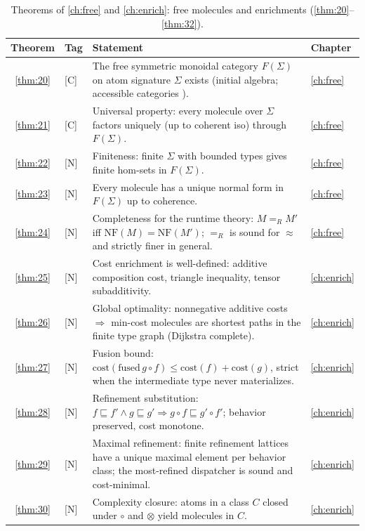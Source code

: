\begin{table}[!htbp]
\centering
\caption{Theorems of \autoref{ch:free} and \autoref{ch:enrich}: free molecules and enrichments (\autoref{thm:20}--\autoref{thm:32}).}
\label{tab:thm-free-enrich}
\small
\begin{tabular}{@{}clp{7.2cm}l@{}}
\toprule
Theorem & Tag & Statement & Chapter\\
\midrule
\ref{thm:20} & [C] & The free symmetric monoidal category $F (\Sigma)$ on atom signature $\Sigma$ exists (initial algebra; accessible categories \cite{adamek}). & \autoref{ch:free}\\
\ref{thm:21} & [C] & Universal property: every molecule over $\Sigma$ factors uniquely (up to coherent iso) through $F (\Sigma)$. & \autoref{ch:free}\\
\ref{thm:22} & [N] & Finiteness: finite $\Sigma$ with bounded types gives finite hom-sets in $F (\Sigma)$. & \autoref{ch:free}\\
\ref{thm:23} & [N] & Every molecule has a unique normal form in $F (\Sigma)$ up to coherence. & \autoref{ch:free}\\
\ref{thm:24} & [N] & Completeness for the runtime theory: $M =_R M'$ iff $\mathrm{NF} (M) = \mathrm{NF} (M')$; $=_R$ is sound for $\approx$ and strictly finer in general. & \autoref{ch:free}\\
\ref{thm:25} & [N] & Cost enrichment is well-defined: additive composition cost, triangle inequality, tensor subadditivity. & \autoref{ch:enrich}\\
\ref{thm:26} & [N] & Global optimality: nonnegative additive costs $\Rightarrow$ min-cost molecules are shortest paths in the finite type graph (Dijkstra complete). & \autoref{ch:enrich}\\
\ref{thm:27} & [N] & Fusion bound: $\mathrm{cost} (\mathrm{fused}\, g\circ f) \le \mathrm{cost} (f)+\mathrm{cost} (g)$, strict when the intermediate type never materializes. & \autoref{ch:enrich}\\
\ref{thm:28} & [N] & Refinement substitution: $f \sqsubseteq f' \wedge g \sqsubseteq g' \Rightarrow g\circ f \sqsubseteq g'\circ f'$; behavior preserved, cost monotone. & \autoref{ch:enrich}\\
\ref{thm:29} & [N] & Maximal refinement: finite refinement lattices have a unique maximal element per behavior class; the most-refined dispatcher is sound and cost-minimal. & \autoref{ch:enrich}\\
\ref{thm:30} & [N] & Complexity closure: atoms in a class $C$ closed under $\circ$ and $\otimes$ yield molecules in $C$. & \autoref{ch:enrich}\\

\end{tabular}
\end{table}
